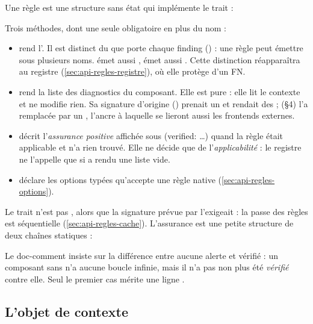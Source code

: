 Une règle est une structure sans état qui implémente le trait  :


Trois méthodes, dont une seule obligatoire en plus du nom :
\begin{itemize}
  \item {} rend l'. Il est distinct du  que porte chaque finding () : une règle peut émettre sous plusieurs noms.  émet aussi ,  émet aussi . Cette distinction réapparaîtra au registre (\cref{sec:api-regles-registre}), où elle protège d'un FN.
  \item {} rend la liste des diagnostics du composant. Elle est pure : elle lit le contexte et ne modifie rien. Sa signature d'origine () prenait un  et rendait des  ;  (§4) l'a remplacée par un , l'ancre à laquelle se lieront aussi les frontends externes.
  \item {} décrit l'\emph{assurance positive} affichée sous  (\og verified: \ldots\fg) quand la règle était applicable et n'a rien trouvé. Elle ne décide que de l'\emph{applicabilité} : le registre ne l'appelle que si  a rendu une liste vide.
  \item {} déclare les options typées qu'accepte une règle native (\cref{sec:api-regles-options}).
\end{itemize}

Le trait n'est pas , alors que la signature prévue par  l'exigeait : la passe des règles est séquentielle (\cref{sec:api-regles-cache}). L'assurance est une petite structure de deux chaînes statiques :


Le doc-comment insiste sur la différence entre \og aucune alerte\fg{} et \og vérifié\fg{} : un composant sans  n'a aucune boucle infinie, mais il n'a pas non plus été \emph{vérifié} contre elle. Seul le premier cas mérite une ligne .

\subsection{L'objet de contexte }

